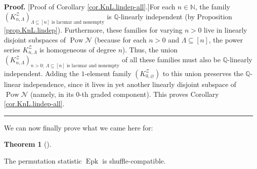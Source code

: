 \documentclass[numbers=enddot,12pt,final,onecolumn,notitlepage]{scrartcl}%
\theoremstyle{definition}
\newtheorem{theo}{Theorem}[section]
\newenvironment{theorem}[1][]
{\begin{theo}[#1]\begin{leftbar}}
{\end{leftbar}\end{theo}}
\newenvironment{proof}[1][Proof]{\noindent\textbf{#1.} }{\ \rule{0.5em}{0.5em}}
\newenvironment{verlong}{}{}
\begin{document}
\begin{verlong}
\begin{proof}
[Proof of Corollary \ref{cor.KnL.lindep-all}.]For each $n\in\mathbb{N}$, the
family $\left(  K_{n,\Lambda}^{\mathcal{Z}}\right)  _{\Lambda\subseteq\left[
n\right]  \text{ is lacunar and nonempty}}$ is $\mathbb{Q}$-linearly
independent (by Proposition \ref{prop.KnL.lindep}). Furthermore, these
families for varying $n>0$ live in linearly disjoint subspaces of
$\operatorname*{Pow}\mathcal{N}$ (because for each $n>0$ and $\Lambda
\subseteq\left[  n\right]  $, the power series $K_{n,\Lambda}^{\mathcal{Z}}$
is homogeneous of degree $n$). Thus, the union $\left(  K_{n,\Lambda
}^{\mathcal{Z}}\right)  _{n>0;\ \Lambda\subseteq\left[  n\right]  \text{ is
lacunar and nonempty}}$ of all these families must also be $\mathbb{Q}%
$-linearly independent. Adding the $1$-element family $\left(
K_{0,\varnothing}^{\mathcal{Z}}\right)  $ to this union preserves the
$\mathbb{Q}$-linear independence, since it lives in yet another linearly
disjoint subspace of $\operatorname*{Pow}\mathcal{N}$ (namely, in its $0$-th
graded component). This proves Corollary \ref{cor.KnL.lindep-all}.
\end{proof}
\end{verlong}

We can now finally prove what we came here for:

\begin{theorem}
\label{thm.Epk.sh-co-a}The permutation statistic $\operatorname*{Epk}$ is shuffle-compatible.
\end{theorem}
\end{document}
